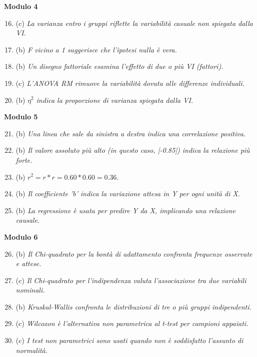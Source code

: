 \documentclass[12pt, a4paper]{article}
\begin{document}
\begin{footnotesize}
\begin{multicols}{2}
\begin{enumerate}
\end{enumerate}
\columnbreak
\textbf{Modulo 4}
\begin{enumerate}
    \setcounter{enumi}{15}
    \item (c) \textit{La varianza entro i gruppi riflette la variabilità casuale non spiegata dalla VI.}
    \item (b) \textit{F vicino a 1 suggerisce che l'ipotesi nulla è vera.}
    \item (b) \textit{Un disegno fattoriale esamina l'effetto di due o più VI (fattori).}
    \item (c) \textit{L'ANOVA RM rimuove la variabilità dovuta alle differenze individuali.}
    \item (b) \textit{$\eta^2$ indica la proporzione di varianza spiegata dalla VI.}
\end{enumerate}
\vspace{0.5cm}
\textbf{Modulo 5}
\begin{enumerate}
    \setcounter{enumi}{20}
    \item (b) \textit{Una linea che sale da sinistra a destra indica una correlazione positiva.}
    \item (b) \textit{Il valore assoluto più alto (in questo caso, |-0.85|) indica la relazione più forte.}
    \item (b) \textit{$r^2 = r * r = 0.60 * 0.60 = 0.36$.}
    \item (b) \textit{Il coefficiente 'b' indica la variazione attesa in Y per ogni unità di X.}
    \item (b) \textit{La regressione è usata per predire Y da X, implicando una relazione causale.}
\end{enumerate}
\vspace{0.5cm}
\textbf{Modulo 6}
\begin{enumerate}
    \setcounter{enumi}{25}
    \item (b) \textit{Il Chi-quadrato per la bontà di adattamento confronta frequenze osservate e attese.}
    \item (c) \textit{Il Chi-quadrato per l'indipendenza valuta l'associazione tra due variabili nominali.}
    \item (b) \textit{Kruskal-Wallis confronta le distribuzioni di tre o più gruppi indipendenti.}
    \item (c) \textit{Wilcoxon è l'alternativa non parametrica al t-test per campioni appaiati.}
    \item (c) \textit{I test non parametrici sono usati quando non è soddisfatto l'assunto di normalità.}
\end{enumerate}
\end{multicols}
\end{footnotesize}
\end{document}
